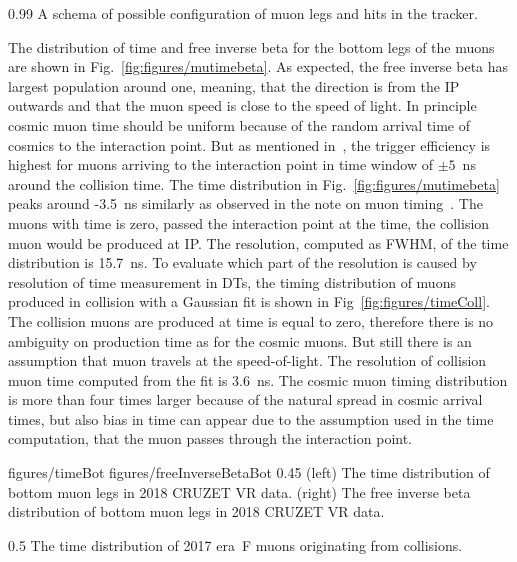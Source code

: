                  {0.99}       %
                 { A schema of possible configuration of muon legs and hits in the tracker. }

The distribution of time and free inverse beta for the bottom legs of the muons are shown in Fig.~\ref{fig:figures/mutimebeta}. As expected, the free inverse beta has largest population around one, meaning, that the direction is from the IP outwards and that the muon speed is close to the speed of light. In principle cosmic muon time should be uniform because of the random arrival time of cosmics to the interaction point. But as mentioned in~\cite{Chatrchyan:2009ig}, the trigger efficiency is highest for muons arriving to the interaction point in time window of $\pm 5$~ns around the collision time. The time distribution in Fig.~\ref{fig:figures/mutimebeta} peaks around -3.5~ns similarly as observed in the note on muon timing~\cite{Traczyk:1365029}. The muons with time is zero, passed the interaction point at the time, the collision muon would be produced at IP. The resolution, computed as FWHM, of the time distribution is 15.7~ns. To evaluate which part of the resolution is caused by resolution of time measurement in DTs, the timing distribution of muons produced in collision with a Gaussian fit is shown in Fig~\ref{fig:figures/timeColl}. The collision muons are produced at time is equal to zero, therefore there is no ambiguity on production time as for the cosmic muons. But still there is an assumption that muon travels at the speed-of-light. The resolution of collision muon time computed from the fit is 3.6~ns. The cosmic muon timing distribution is more than four times larger because of the natural spread in cosmic arrival times, but also bias in time can appear due to the assumption used in the time computation, that the muon passes through the interaction point.
 

                 {figures/timeBot}
                 {figures/freeInverseBetaBot} %
                 {0.45}       %
                 {(left) The time distribution of bottom muon legs in 2018 CRUZET VR data. (right) The free inverse beta distribution of bottom muon legs in 2018 CRUZET VR data.}


                 {0.5}       %
                 { The time distribution of 2017 era~F muons originating from collisions.  }


